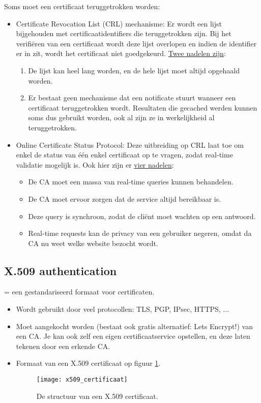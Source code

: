 \documentclass{report}
\begin{document}
	Soms moet een certificaat teruggetrokken worden:
	\begin{itemize}
		\item[\info] Certificate Revocation List (CRL) mechanisme: Er wordt een lijst bijgehouden met certificaatidentifiers die teruggetrokken zijn. Bij het verifiëren van een certificaat wordt deze lijst overlopen en indien de identifier er in zit, wordt het certificaat niet goedgekeurd. \underline{Twee nadelen zijn}:
		\begin{enumerate}
			\item[\alert] De lijst kan heel lang worden, en de hele lijst moet altijd opgehaald worden.
			\item[\alert] Er bestaat geen mechanisme dat een notificate stuurt wanneer een certificaat teruggetrokken wordt. Resultaten die gecached werden kunnen soms dus gebruikt worden, ook al zijn ze in werkelijkheid al teruggetrokken.
		\end{enumerate}
		\item[\info] Online Certificate Status Protocol: Deze uitbreiding op CRL laat toe om enkel de status van één enkel certificaat op te vragen, zodat real-time validatie mogelijk is. Ook hier zijn er \underline{vier nadelen}:
		\begin{itemize}
			\item[\alert] De CA moet een massa van real-time queries kunnen behandelen.
			\item[\alert] De CA moet ervoor zorgen dat de service altijd bereikbaar is.
			\item[\alert] Deze query is synchroon, zodat de cliënt moet wachten op een antwoord.
			\item[\alert] Real-time requests kan de privacy van een gebruiker negeren, omdat da CA nu weet welke website bezocht wordt. 
		\end{itemize}

	\end{itemize}

	\subsection{X.509 authentication}
	= een gestandariseerd formaat voor certificaten.
	\begin{itemize}
		\item[\info] Wordt gebruikt door veel protocollen: TLS, PGP, IPsec, HTTPS, ...
		\item[\info] Moet aangekocht worden (bestaat ook gratis alternatief: Lets Encrypt!) van een CA. Je kan ook zelf een eigen certificaatservice opstellen, en deze laten tekenen door een erkende CA.
		\item[\info] Formaat van een X.509 certificaat op figuur \ref{fig:x509_certificaat}. 
		\begin{figure}[ht]
			\centering
			\texttt{[image: x509\_certificaat]}
			\caption{De structuur van een X.509 certificaat.}
			\label{fig:x509_certificaat}
		\end{figure}
	\end{itemize}
\end{document}
